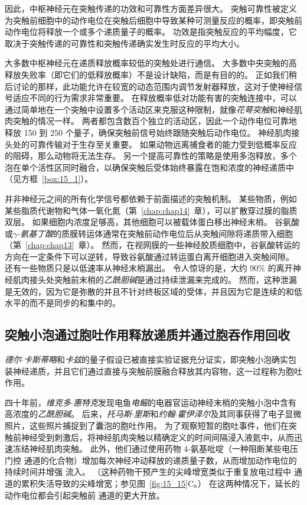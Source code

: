 因此，中枢神经元在突触传递的功效和可靠性方面差异很大。
突触可靠性被定义为突触前细胞中的动作电位在突触后细胞中导致某种可测量反应的概率，即突触前动作电位将释放一个或多个递质量子的概率。
功效是指突触反应的平均幅度，它取决于突触传递的可靠性和突触传递确实发生时反应的平均大小。


大多数中枢神经元在递质释放概率较低的突触处进行通信。
大多数中央突触的高释放失败率（即它们的低释放概率）不是设计缺陷，而是有目的的。
正如我们稍后讨论的那样，此功能允许在较宽的动态范围内调节发射器释放，这对于使神经信号适应不同的行为需求非常重要。
在释放概率低对功能有害的突触连接中，可以通过简单地在一个突触中设置多个活动区来克服这种限制，就像\textit{花萼突触}和神经肌肉突触的情况一样。
两者都包含数百个独立的活动区，因此一个动作电位可靠地释放 150 到 250 个量子，确保突触前信号始终跟随突触后动作电位。
神经肌肉接头处的可靠传输对于生存至关重要。
如果动物远离捕食者的能力受到低概率反应的阻碍，那么动物将无法生存。
另一个提高可靠性的策略是使用多泡释放，多个泡在单个活性区同时融合，以确保突触后受体始终暴露在饱和浓度的神经递质中（见方框~\ref{box:15_1}）。


并非神经元之间的所有化学信号都依赖于前面描述的突触机制。
某些物质，例如某些脂质代谢物和气体一氧化氮（第~\ref{chap:chap14}~章），可以扩散穿过膜的脂质双层。
如果细胞内浓度足够高，其他细胞可以被载体蛋白移出神经末梢。
谷氨酸或\textit{$\gamma$-氨基丁酸}的质膜转运体通常在突触前动作电位后从突触间隙将递质带入细胞（第~\ref{chap:chap13}~章）。
然而，在视网膜的一些神经胶质细胞中，谷氨酸转运的方向在一定条件下可以逆转，导致谷氨酸通过转运蛋白离开细胞进入突触间隙。
还有一些物质只是以低速率从神经末梢漏出。
令人惊讶的是，大约 90\% 的离开神经肌肉接头处突触前末梢的\textit{乙酰胆碱}是通过持续泄漏来完成的。
然而，这种泄漏是无效的，因为它是弥散的并且不针对终板区域的受体，并且因为它是连续的和低水平的而不是同步的和集中的。



\subsection{突触小泡通过胞吐作用释放递质并通过胞吞作用回收}

\textit{德尔$\cdot$卡斯蒂略}和\textit{卡兹}的量子假设已被直接实验证据充分证实，即突触小泡确实包装神经递质，并且它们通过直接与突触前膜融合释放其内容物，这一过程称为胞吐作用。


四十年前，\textit{维克多$\cdot$惠特克}发现电鱼\textit{电鳐}的电器官运动神经末梢的突触小泡中含有高浓度的\textit{乙酰胆碱}。
后来，\textit{托马斯$\cdot$里斯}和\textit{约翰$\cdot$霍伊泽尔}及其同事获得了电子显微照片，这些照片捕捉到了囊泡的胞吐作用。
为了观察短暂的胞吐事件，他们在突触前神经受到刺激后，将神经肌肉突触以精确定义的时间间隔浸入液氦中，从而迅速冻结神经肌肉突触。
此外，他们通过使用药物 4-氨基吡啶（一种阻断某些电压门控  通道的化合物）增加每次神经冲动释放的递质量子数，从而增加动作电位的持续时间并增强  流入。
（这种药物干预产生的尖峰增宽类似于重复放电过程中  通道的累积失活导致的尖峰增宽；参见图~\ref{fig:15_15}C。）
在这两种情况下，延长的动作电位都会引起突触前  通道的更大开放。


